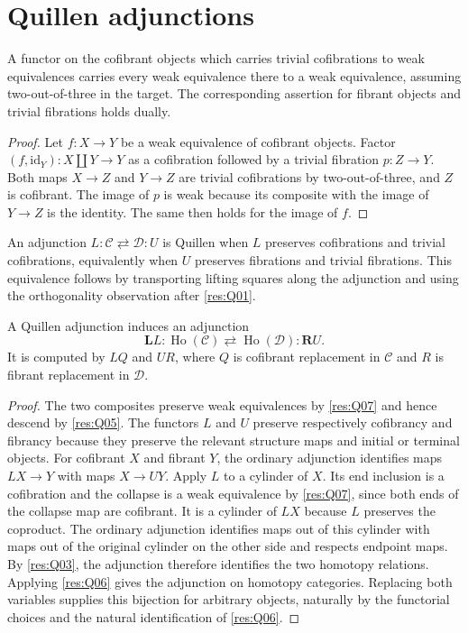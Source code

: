 \section{Quillen adjunctions}

\begin{lemma}\label{res:Q07}
A functor on the cofibrant objects which carries trivial
cofibrations to weak equivalences carries every weak
equivalence there to a weak equivalence, assuming two-out-of-three
in the target. The corresponding assertion for fibrant
objects and trivial fibrations holds dually.
\end{lemma}
\begin{proof}
Let \(f:X\to Y\) be a weak equivalence of cofibrant objects.
Factor \((f,\mathrm{id}_Y):X\amalg Y\to Y\) as a
cofibration followed by a trivial fibration \(p:Z\to Y\).
Both maps \(X\to Z\) and \(Y\to Z\) are trivial
cofibrations by two-out-of-three, and \(Z\) is cofibrant.
The image of \(p\) is weak because its composite with
the image of \(Y\to Z\) is the identity. The same then
holds for the image of \(f\).
\end{proof}

An adjunction \(L:\mathcal C\rightleftarrows\mathcal D:U\)
is Quillen when \(L\) preserves cofibrations and trivial
cofibrations, equivalently when \(U\) preserves fibrations
and trivial fibrations. This equivalence follows by
transporting lifting squares along the adjunction and
using the orthogonality observation after \ref{res:Q01}.

\begin{theorem}\label{res:Q08}
A Quillen adjunction induces an adjunction
\[
 \mathbf L L:\operatorname{Ho}(\mathcal C)
 \rightleftarrows \operatorname{Ho}(\mathcal D):\mathbf R U.
\]
It is computed by \(LQ\) and \(UR\), where \(Q\) is
cofibrant replacement in \(\mathcal C\) and \(R\)
is fibrant replacement in \(\mathcal D\).
\end{theorem}
\begin{proof}
The two composites preserve weak equivalences by
\ref{res:Q07} and hence descend by \ref{res:Q05}.
The functors \(L\) and \(U\) preserve respectively
cofibrancy and fibrancy because they preserve the relevant
structure maps and initial or terminal objects.
For cofibrant \(X\) and fibrant \(Y\), the ordinary adjunction
identifies maps \(LX\to Y\) with maps \(X\to UY\).
Apply \(L\) to a cylinder of \(X\). Its end inclusion
is a cofibration and the collapse is a weak equivalence
by \ref{res:Q07}, since both ends of the collapse map
are cofibrant. It is a cylinder of \(LX\) because \(L\)
preserves the coproduct. The ordinary adjunction identifies
maps out of this cylinder with maps out of the original
cylinder on the other side and respects endpoint maps.
By \ref{res:Q03}, the adjunction therefore identifies
the two homotopy relations. Applying \ref{res:Q06} gives
the adjunction on homotopy categories. Replacing both
variables supplies this bijection for arbitrary objects,
naturally by the functorial choices and the natural
identification of \ref{res:Q06}.
\end{proof}

